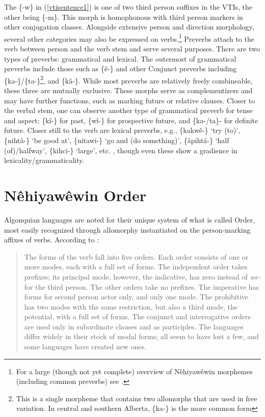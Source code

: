 The \{-w\} in (\ref{vtisentence1}) is one of two third person suffixes in the VTIs, the other being \{-m\}. This morph is homophonous with third person markers in other conjugation classes. Alongside extensive person and direction morphology, several other categories may also be expressed on verbs.\footnote{For a large (though not yet complete) overview of Nêhiyawêwin morphemes (including common preverbs) see \citet{CookMuehl2010}.} Preverbs attach to the verb between person and the verb stem and serve several purposes. There are two types of preverbs: grammatical and lexical. The outermost of grammatical preverbs include those such as \{\^{e-}\} and other Conjunct preverbs including \{ka-\}/\{ta-\}\footnote{This is a single morpheme that contains two allomorphs that are used in free variation. In central and southern Alberta, \{ka-\} is the more common form}, and \{kâ-\}. While most preverbs are relatively freely combineable, these three are mutually exclusive. These morphs serve as complementizers and may have further functions, such as marking future or relative clauses. Closer to the verbal stem, one can observe another type of grammatical preverb for tense and aspect: \{k\^{i}-\} for past, \{w\^{i}-\} for prospective future, and \{ka-/ta\}- for definite future. Closer still to the verb are lexical preverbs, e.g., \{kakw\^{e}-\} `try (to)', \{niht\^{a}-\} `be good at', \{nitawi-\} `go and (do something)', \{\^{a}piht\^{a}-\} `half (of)/halfway', \{kihci-\} `large', etc. \citep{Wolfart1973,Wolfart1996,Wolvengrey2001}, though even these show a gradience in lexicality/grammaticality.




\section{Nêhiyawêwin Order}
\label{SecOrder}
 Algonquian languages are noted for their unique system of what is called Order, most easily recognized through allomorphy instantiated on the person-marking affixes of verbs. According to \citet[97]{Bloomfield1946}:

\begin{quote}
The forms of the verb fall into five orders. Each order consists of one or more modes, each with a full set of forms. The independent order takes prefixes; its principal mode, however, the indicative, has zero instead of \textit{we-} for the third person. The other orders take no prefixes. The imperative has forms for second person actor only, and only one mode. The prohibitive has two modes with the same restriction, but also a third mode, the potential, with a full set of forms. The conjunct and interrogative orders are used only in subordinate clauses and as participles. The languages differ widely in their stock of modal forms; all seem to have lost a few, and some languages have created new ones.
\end{quote}

